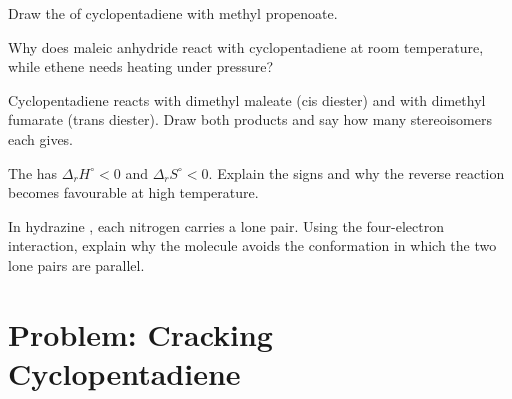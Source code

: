 \begin{exercise}[$\star\star$]\label{exo:b2:frontier-orbitals:8}
Draw the  of cyclopentadiene with methyl propenoate.
\end{exercise}

\begin{exercise}[$\star\star$]\label{exo:b2:frontier-orbitals:9}
Why does maleic anhydride react with cyclopentadiene at room temperature, while ethene
needs heating under pressure?
\end{exercise}

\begin{exercise}[$\star\star\star$]\label{exo:b2:frontier-orbitals:10}
Cyclopentadiene reacts with dimethyl maleate (cis diester) and with dimethyl fumarate
(trans diester). Draw both products and say how many stereoisomers each gives.
\end{exercise}

\begin{exercise}[$\star\star\star$]\label{exo:b2:frontier-orbitals:11}
The  has $\Delta_r H^\circ < 0$ and $\Delta_r S^\circ < 0$. Explain the signs
and why the reverse reaction becomes favourable at high temperature.
\end{exercise}

\begin{exercise}[$\star\star\star$]\label{exo:b2:frontier-orbitals:12}
In hydrazine , each nitrogen carries a lone pair. Using the four-electron
interaction, explain why the molecule avoids the conformation in which the two lone
pairs are parallel.
\end{exercise}

\section{Problem: Cracking Cyclopentadiene}

